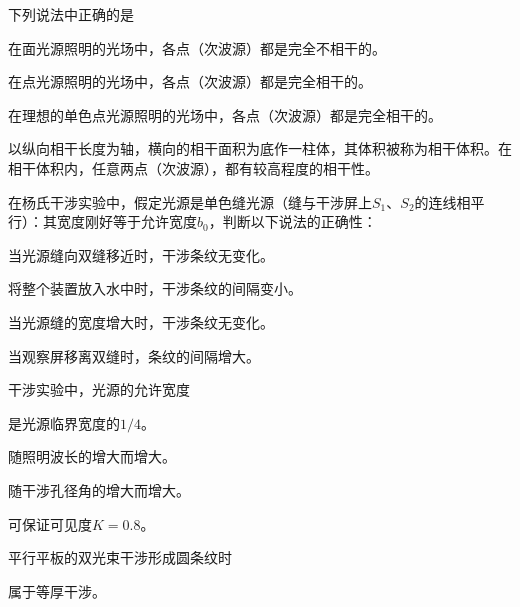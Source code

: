 \documentclass[standard, analysis, notocnum]{ExBook}
\newcommand{\answerarea}[1][8cm]{%
  \par\vspace{2mm}%
  \noindent{\color{themeColor!35}\rule{\linewidth}{0.4pt}}\par
  \noindent\begin{minipage}[t][#1][t]{\linewidth}\vspace{0pt}\end{minipage}\par
  \noindent{\color{themeColor!35}\rule{\linewidth}{0.4pt}}\par
}
\begin{document}
\begin{qitems}
\begin{bbox}
\qitem 下列说法中正确的是
\par\noindent\hspace{2em}在面光源照明的光场中，各点（次波源）都是完全不相干的。
\par\noindent\hspace{2em}在点光源照明的光场中，各点（次波源）都是完全相干的。
\par\noindent\hspace{2em}在理想的单色点光源照明的光场中，各点（次波源）都是完全相干的。
\par\noindent\hspace{2em}以纵向相干长度为轴，横向的相干面积为底作一柱体，其体积被称为相干体积。在相干体积内，任意两点（次波源），都有较高程度的相干性。
\answerarea[3.5cm]
\end{bbox}
\begin{bbox}
\qitem 在杨氏干涉实验中，假定光源是单色缝光源（缝与干涉屏上$S_{1}$、$S_{2}$的连线相平行）：其宽度刚好等于允许宽度$b_{0}$，判断以下说法的正确性：
\par\noindent\hspace{2em}当光源缝向双缝移近时，干涉条纹无变化。
\par\noindent\hspace{2em}将整个装置放入水中时，干涉条纹的间隔变小。
\par\noindent\hspace{2em}当光源缝的宽度增大时，干涉条纹无变化。
\par\noindent\hspace{2em}当观察屏移离双缝时，条纹的间隔增大。
\answerarea[3.5cm]
\end{bbox}
\begin{bbox}
\qitem 干涉实验中，光源的允许宽度
\par\noindent\hspace{2em}是光源临界宽度的$1/4$。
\par\noindent\hspace{2em}随照明波长的增大而增大。
\par\noindent\hspace{2em}随干涉孔径角的增大而增大。
\par\noindent\hspace{2em}可保证可见度$K=0.8$。
\answerarea[3.5cm]
\end{bbox}
\begin{bbox}
\qitem 平行平板的双光束干涉形成圆条纹时
\par\noindent\hspace{2em}属于等厚干涉。

\end{bbox}
\end{qitems}
\end{document}
